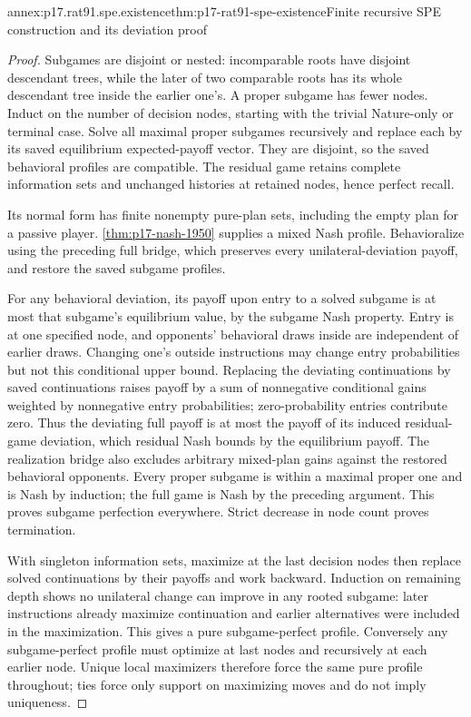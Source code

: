\begin{annexitem}{annex:p17.rat91.spe.existence}{thm:p17-rat91-spe-existence}{Finite recursive SPE construction and its deviation proof}
\begin{proof}
Subgames are disjoint or nested: incomparable roots have disjoint
descendant trees, while the later of two comparable roots has its
whole descendant tree inside the earlier one's. A proper subgame
has fewer nodes. Induct on the number of decision nodes, starting
with the trivial Nature-only or terminal case. Solve all maximal
proper subgames recursively and replace each by its saved equilibrium
expected-payoff vector. They are disjoint, so the saved behavioral
profiles are compatible. The residual game retains complete
information sets and unchanged histories at retained nodes, hence
perfect recall.

Its normal form has finite nonempty pure-plan sets, including the
empty plan for a passive player. \cref{thm:p17-nash-1950} supplies
a mixed Nash profile. Behavioralize using the preceding full bridge,
which preserves every unilateral-deviation payoff, and restore
the saved subgame profiles.

For any behavioral deviation, its payoff upon entry to a solved
subgame is at most that subgame's equilibrium value, by the subgame
Nash property. Entry is at one specified node, and opponents'
behavioral draws inside are independent of earlier draws. Changing
one's outside instructions may change entry probabilities but not
this conditional upper bound. Replacing the deviating continuations
by saved continuations raises payoff by a sum of nonnegative
conditional gains weighted by nonnegative entry probabilities;
zero-probability entries contribute zero. Thus the deviating full
payoff is at most the payoff of its induced residual-game deviation,
which residual Nash bounds by the equilibrium payoff. The realization
bridge also excludes arbitrary mixed-plan gains against the restored
behavioral opponents. Every proper subgame is within a maximal
proper one and is Nash by induction; the full game is Nash by the
preceding argument. This proves subgame perfection everywhere.
Strict decrease in node count proves termination.

With singleton information sets, maximize at the last decision nodes
then replace solved continuations by their payoffs and work backward.
Induction on remaining depth shows no unilateral change can improve
in any rooted subgame: later instructions already maximize continuation
and earlier alternatives were included in the maximization. This
gives a pure subgame-perfect profile. Conversely any subgame-perfect
profile must optimize at last nodes and recursively at each earlier
node. Unique local maximizers therefore force the same pure profile
throughout; ties force only support on maximizing moves and do
not imply uniqueness.
\end{proof}
\end{annexitem}
